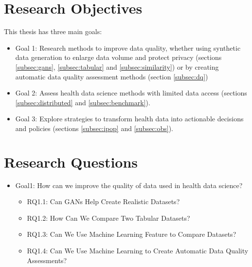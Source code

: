 
\section{Research Objectives}
This thesis has three main goals:


\begin{itemize}
    \item Goal 1: Research methods to improve data quality, whether using synthetic data generation to enlarge data volume and protect privacy (sections \ref{subsec:gans}, \ref{subsec:tabular} and \ref{subsec:similarity}) or by creating automatic data quality assessment methods (section \ref{subsec:dq})

    \item Goal 2: Assess health data science  methods with limited data access (sections \ref{subsec:distributed} and \ref{subsec:benchmark}).

    \item Goal 3: Explore strategies to transform health data into actionable decisions and policies (sections  \ref{subsec:ipop} and \ref{subsec:obs}).
\end{itemize}


\section{Research Questions}

\begin{itemize}
    \item Goal1: How can we improve the quality of data used in health data science?
    \begin{itemize}
        \item RQ1.1: Can GANs Help Create Realistic Datasets?
        \item RQ1.2: How Can We Compare Two Tabular Datasets?
        \item RQ1.3: Can We Use Machine Learning Feature to Compare Datasets?
        \item RQ1.4: Can We Use Machine Learning to Create Automatic Data Quality Assessments?
    \end{itemize}
\end{itemize}

